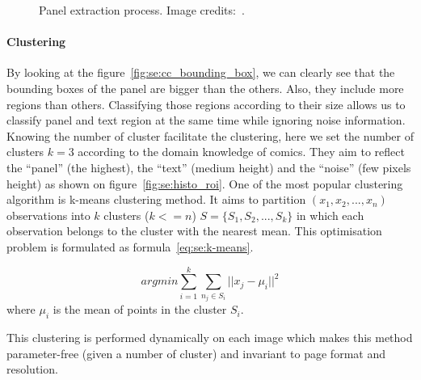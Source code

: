 \begin{figure}
		  \caption[Panel extraction process]{Panel extraction process. Image credits:~\cite{Bubble09}.}
	\end{figure}




\paragraph{Clustering} %
\label{par:clustering}
By looking at the figure~\ref{fig:se:cc_bounding_box}, we can clearly see that the bounding boxes of the panel are bigger than the others.
Also, they include more regions than others.
Classifying those regions according to their size allows us to classify panel and text region at the same time while ignoring noise information.
Knowing the number of cluster facilitate the clustering, here 
we set the number of clusters $k=3$ according to the domain knowledge of comics.
They aim to reflect the ``panel'' (the highest), the ``text'' (medium height) and the ``noise'' (few pixels height) as shown on figure~\ref{fig:se:histo_roi}.
One of the most popular clustering algorithm is k-means clustering method.
It aims to partition $(x_1, x_2, ...,x_n)$ observations into $k$ clusters ($k <= n$) $S=\{S_1, S_2, ..., S_k\}$ in which each observation belongs to the cluster with the nearest mean.
This optimisation problem is formulated as formula~\ref{eq:se:k-means}.

\begin{equation}
	arg min \sum\limits_{i=1}^k \sum\limits_{n_j \in S_i} ||x_j - \mu_i||^2
	\label{eq:se:k-means}
\end{equation}
where $\mu_i$ is the mean of points in the cluster $S_i$.

This clustering is performed dynamically on each image which makes this method parameter-free (given a number of cluster) and invariant to page format and resolution.

